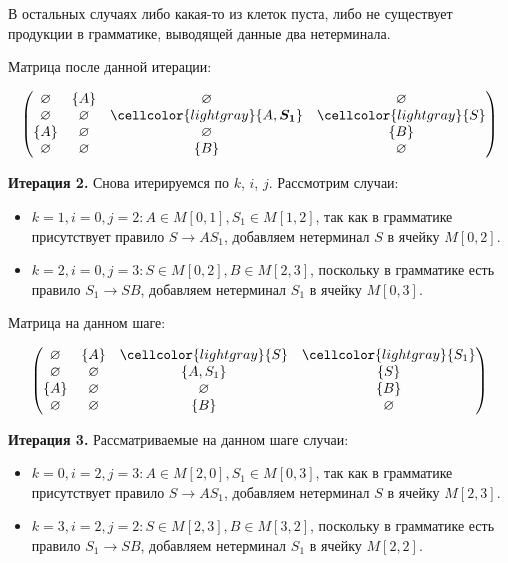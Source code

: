 \begin{example}
В остальных случаях либо какая-то из клеток пуста, либо не существует продукции в грамматике, выводящей данные два нетерминала.

Матрица после данной итерации:

\[
\begin{pmatrix}
\varnothing & \{A\}       & \varnothing & \varnothing \\
\varnothing & \varnothing & \cellcolor{lightgray}\{A, \boldsymbol{S_1}\}  & \cellcolor{lightgray}\{S\}       \\
\{A\}       & \varnothing & \varnothing & \{B\}       \\
\varnothing & \varnothing & \{B\}       & \varnothing \\
\end{pmatrix}
\]

\textbf{Итерация 2.}
Снова итерируемся по $k$, $i$, $j$. Рассмотрим случаи:

\begin{itemize}
    \setlength\itemsep{1em}
    \item $k = 1, i = 0, j = 2: A \in M[0, 1], S_1 \in M[1, 2]$, так как в грамматике присутствует правило $S \to A S_1$, добавляем нетерминал $S$ в ячейку $M[0, 2]$.
    \item $k = 2, i = 0, j = 3: S \in M[0, 2], B \in M[2, 3]$, поскольку в грамматике есть правило $S_1 \to S B$, добавляем нетерминал $S_1$ в ячейку $M[0, 3]$.
\end{itemize}

Матрица на данном шаге:

\[
\begin{pmatrix}
\varnothing & \{A\}       & \cellcolor{lightgray}\{S\}       & \cellcolor{lightgray}\{S_1\}     \\
\varnothing & \varnothing & \{A, S_1\}  & \{S\}       \\
\{A\}       & \varnothing & \varnothing & \{B\}       \\
\varnothing & \varnothing & \{B\}       & \varnothing \\
\end{pmatrix}
\]

\textbf{Итерация 3.}
Рассматриваемые на данном шаге случаи:

\begin{itemize}
    \setlength\itemsep{1em}
    \item $k = 0, i = 2, j = 3: A \in M[2, 0], S_1 \in M[0, 3]$, так как в грамматике присутствует правило $S \to A S_1$, добавляем нетерминал $S$ в ячейку $M[2, 3]$.
    \item $k = 3, i = 2, j = 2: S \in M[2, 3], B \in M[3, 2]$, поскольку в грамматике есть правило $S_1 \to S B$, добавляем нетерминал $S_1$ в ячейку $M[2, 2]$.
\end{itemize}


\end{example}
